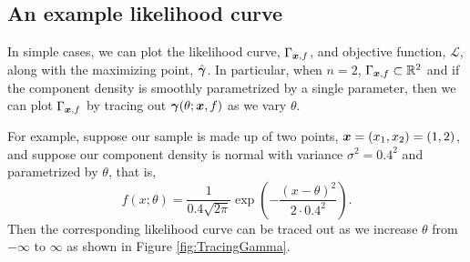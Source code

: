 	\subsection{An example likelihood curve}
		\label{sec:mixturelikelihoods:example}
		In simple cases, we can plot the likelihood curve, $\Gamma_{{\bm{{x}}}, f}$, and objective function, $\mathcal{L}$, along with the maximizing point, $\hat{{\bm{{\gamma}}}}$. In particular, when $n = 2$, $\Gamma_{{\bm{{x}}}, f} \subset \mathbb{R}^2$ and if the component density is smoothly parametrized by a single parameter, then we can plot $\Gamma_{{\bm{{x}}}, f}$ by tracing out ${\bm{{\gamma}}}(\theta; {\bm{{x}}}, f)$ as we vary $\theta$.

		For example, suppose our sample is made up of two points, ${\bm{{x}}} = (x_1, x_2) = (1,2)$, and suppose our component density is normal with variance $\sigma^2 = 0.4^2$ and parametrized by $\theta$, that is,
		\begin{equation}
		f(x;\theta) = \frac{1}{0.4 \sqrt{2 \pi}} \exp\left(-\frac{(x-\theta)^2}{2\cdot 0.4^2}\right).
		\label{eq:example component density for likelihood curve}
		\end{equation}
		Then the corresponding likelihood curve can be traced out as we increase $\theta$ from $-\infty$ to $\infty$ as shown in Figure \ref{fig:TracingGamma}. 

